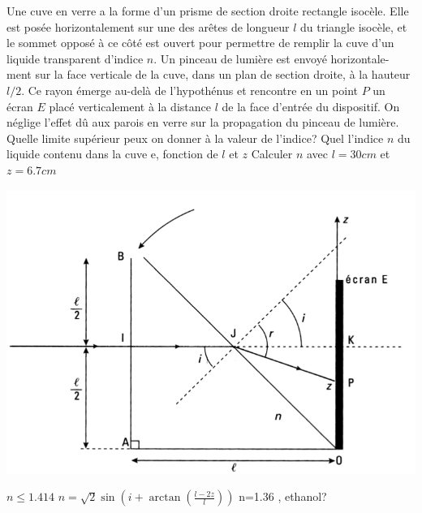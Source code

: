 \begin{Exercise}[title=Indice d'un liquide]
Une cuve en verre a la forme d’un prisme de section droite rectangle isocèle. Elle est posée horizontalement sur une des arêtes de longueur $l$ du triangle isocèle, et le sommet opposé à ce côté est ouvert pour permettre de remplir la cuve d’un liquide transparent d’indice $n$.
Un pinceau de lumière est envoyé horizontale-
ment sur la face verticale de la cuve, dans un plan de section droite, à la hauteur $l/2$.
Ce rayon émerge au-delà de l’hypothénus et rencontre en un point $P$ un écran $E$ placé verticalement à la distance $l$ de la face d’entrée du dispositif.
On néglige l’effet dû aux parois en verre
sur la propagation du pinceau de lumière.
\Question Quelle limite supérieur peux on donner à la valeur de l'indice?
\Question Quel l'indice $n$ du liquide contenu dans la cuve e, fonction de $l$ et $z$
\Question Calculer $n$ avec $l=30 cm$ et$z=6.7cm$
\begin{center}
\includegraphics[scale=0.4]{./fig/indice_liq.png}
\end{center}
\end{Exercise}
\begin{Answer}
\Question $n\leq 1.414$
\Question $n =\sqrt{2}\sin\left(i+\arctan\left(\frac{l-2z}{l}\right)\right)$
\Question n=1.36 , ethanol?
\end{Answer}
